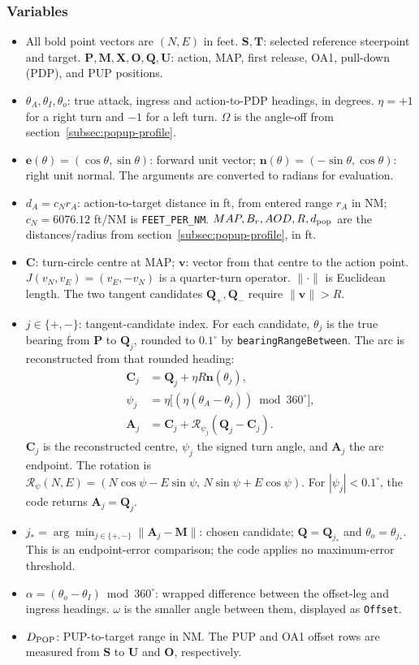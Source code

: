 \documentclass[10pt,a4paper]{amsart}
\begin{document}
\subsubsection*{Variables}
\begin{itemize}
\setlength{\itemsep}{0pt}
\setlength{\parsep}{0pt}
\item All bold point vectors are $(N,E)$ in feet.
$\mathbf S,\mathbf T$: selected reference steerpoint and target.
$\mathbf P,\mathbf M,\mathbf X,\mathbf O,\mathbf Q,\mathbf U$:
action, MAP, first release, OA1, pull-down (PDP), and PUP positions.
\item $\theta_A,\theta_I,\theta_o$: true attack, ingress and
action-to-PDP headings, in degrees.
$\eta=+1$ for a right turn and $-1$ for a left turn.
$\Omega$ is the angle-off from section~\ref{subsec:popup-profile}.
\item $\mathbf e(\theta)=(\cos\theta,\sin\theta)$: forward unit vector;
$\mathbf n(\theta)=(-\sin\theta,\cos\theta)$: right unit normal.
The arguments are converted to radians for evaluation.
\item $d_A=c_Nr_A$: action-to-target distance in ft, from entered
range $r_A$ in NM; $c_N=6076.12$ ft/NM is \texttt{FEET\_PER\_NM}.
$MAP,B_r,AOD,R,d_{\rm pop}$ are the distances/radius from
section~\ref{subsec:popup-profile}, in ft.
\item $\mathbf C$: turn-circle centre at MAP; $\mathbf v$: vector
from that centre to the action point.
$J(v_N,v_E)=(v_E,-v_N)$ is a quarter-turn operator.
$\|\cdot\|$ is Euclidean length. The two tangent candidates
$\mathbf Q_+,\mathbf Q_-$ require $\|\mathbf v\|>R$.
\item $j\in\{+,-\}$: tangent-candidate index. For each candidate,
$\theta_j$ is the true bearing from $\mathbf P$ to $\mathbf Q_j$,
rounded to $0.1^\circ$ by \texttt{bearingRangeBetween}.
The arc is reconstructed from that rounded heading:
\begin{align*}
 \mathbf C_j&=\mathbf Q_j+\eta R\mathbf n(\theta_j),\\
 \psi_j&=\eta\bigl[(\eta(\theta_A-\theta_j))\bmod360^\circ\bigr],\\
 \mathbf A_j&=\mathbf C_j+\mathcal R_{\psi_j}(\mathbf Q_j-\mathbf C_j).
\end{align*}
$\mathbf C_j$ is the reconstructed centre, $\psi_j$ the signed
turn angle, and $\mathbf A_j$ the arc endpoint.
The rotation is
$\mathcal R_\psi(N,E)=(N\cos\psi-E\sin\psi,\,
N\sin\psi+E\cos\psi)$.
For $|\psi_j|<0.1^\circ$, the code returns $\mathbf A_j=\mathbf Q_j$.
\item $j_*=\arg\min_{j\in\{+,-\}}\|\mathbf A_j-\mathbf M\|$:
chosen candidate; $\mathbf Q=\mathbf Q_{j_*}$ and
$\theta_o=\theta_{j_*}$. This is an endpoint-error comparison;
the code applies no maximum-error threshold.
\item $\alpha=(\theta_o-\theta_I)\bmod360^\circ$:
wrapped difference between the offset-leg and ingress headings.
$\omega$ is the smaller angle between them, displayed as \texttt{Offset}.
\item $D_{\rm POP}$: PUP-to-target range in NM.
The PUP and OA1 offset rows are measured from $\mathbf S$ to
$\mathbf U$ and $\mathbf O$, respectively.
\end{itemize}
\end{document}
